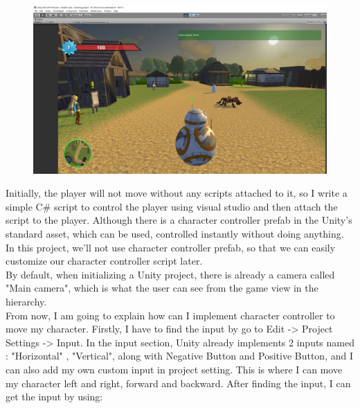 \documentclass[a4paper, 13pt]{extarticle}
\begin{document}
 	 \begin{figure}[h]
 	 	\centering
 	 	\begin{minipage}{1\textwidth}
 	 		\centering
 	 		\includegraphics[width=0.75\linewidth]{intructions/4.png}
 	 		\label{fig:test5}
 	 	\end{minipage}
 	 \end{figure}
 	  
 	 Initially, the player will not move without any scripts attached to it, so I write a simple C\# script to control the player using visual studio and then attach the script to the player. Although there is a character controller prefab in the Unity's standard asset, which can be used, controlled instantly without doing anything. In this project, we'll not use character controller prefab, so that we can easily customize our character controller script later. \\[0.25cm] By default, when initializing a Unity project, there is already a camera called "Main camera", which is what the user can see from the game view in the hierarchy.  
 	 \\[0.25cm] From now, I am going to explain how can I implement character controller to move my character. Firstly, I have to find the input by go to Edit -> Project Settings -> Input. In the input section, Unity already implements 2 inputs named : "Horizontal" , "Vertical", along with Negative Button and Positive Button, and I can also add my own custom input in project setting. This is where I can move my character left and right, forward and backward. After finding the input, I can get the input by using: 
  
\end{document}
